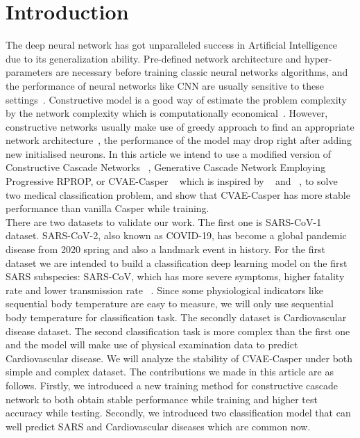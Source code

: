 \section{Introduction}
The deep neural network has got unparalleled success in Artificial Intelligence due to its generalization ability. Pre-defined network architecture and hyper-parameters are necessary before training classic neural networks algorithms, and the performance of neural networks like CNN are usually sensitive to these settings~\cite{CNNClassification2015}. Constructive model is a good way of estimate the problem complexity by the network complexity which is computationally economical~\cite{constructive}. However, constructive networks usually make use of greedy approach to find an appropriate network architecture~\cite{constructive}, the performance of the model may drop right after adding new initialised neurons. In this article we intend to use a modified version of Constructive Cascade Networks ~\cite{GeneralisationConstructiveCascade2009}, Generative Cascade Network Employing Progressive RPROP, or CVAE-Casper ~\cite{CASPER1997} which is inspired by ~\cite{CASPER1997} and ~\cite{cvae}, to solve two medical classification problem, and show that CVAE-Casper has more stable performance than vanilla Casper while training. \\
There are two datasets to validate our work. The first one is SARS-CoV-1 dataset. SARS-CoV-2, also known as COVID-19, has become a global pandemic disease from 2020 spring and also a landmark event in history. For the first dataset we are intended to build a classification deep learning model on the first SARS subspecies: SARS-CoV, which has more severe symptoms, higher fatality rate and lower transmission rate ~\cite{SARSCOV2_2020}. Since some physiological indicators like sequential body temperature are easy to measure, we will only use sequential body temperature for classification task. The secondly dataset is Cardiovascular disease dataset. The second classification task is more complex than the first one and the model will make use of physical examination data to predict Cardiovascular disease. We will analyze the stability of CVAE-Casper under both simple and complex dataset. The contributions we made in this article are as follows. Firstly, we introduced a new training method for constructive cascade network to both obtain stable performance while training and higher test accuracy while testing. Secondly, we introduced two classification model that can well predict SARS and Cardiovascular diseases which are common now.